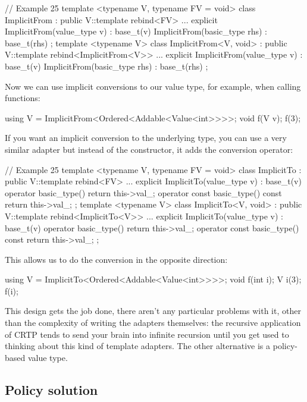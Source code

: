 \begin{code}
// Example 25
template <typename V, typename FV = void>
class ImplicitFrom : public V::template rebind<FV> {
  ...
  explicit ImplicitFrom(value_type v) : base_t(v) {}
  ImplicitFrom(basic_type rhs) : base_t(rhs) {}
};
template <typename V> class ImplicitFrom<V, void> :
  public V::template rebind<ImplicitFrom<V>> {
  ...
  explicit ImplicitFrom(value_type v) : base_t(v) {}
  ImplicitFrom(basic_type rhs) : base_t(rhs) {}
};
\end{code}

Now we can use implicit conversions to our value type, for example, when calling functions:

\begin{code}
using V = ImplicitFrom<Ordered<Addable<Value<int>>>>;
void f(V v);
f(3);
\end{code}

If you want an implicit conversion to the underlying type, you can use a very similar adapter but instead of the constructor, it adds the conversion operator:

\begin{code}
// Example 25
template <typename V, typename FV = void>
class ImplicitTo : public V::template rebind<FV> {
  ...
  explicit ImplicitTo(value_type v) : base_t(v) {}
  operator basic_type(){ return this->val_; }
  operator const basic_type() const { return this->val_; }
};
template <typename V> class ImplicitTo<V, void> :
  public V::template rebind<ImplicitTo<V>> {
  ...
  explicit ImplicitTo(value_type v) : base_t(v) {}
  operator basic_type(){ return this->val_; }
  operator const basic_type() const { return this->val_; }
};
\end{code}

This allows us to do the conversion in the opposite direction:

\begin{code}
using V = ImplicitTo<Ordered<Addable<Value<int>>>>;
void f(int i);
V i(3);
f(i);
\end{code}

This design gets the job done, there aren't any particular problems with it, other than the complexity of writing the adapters themselves: the recursive application of CRTP tends to send your brain into infinite recursion until you get used to thinking about this kind of template adapters. The other alternative is a policy-based value type.

\subsection{Policy solution}

